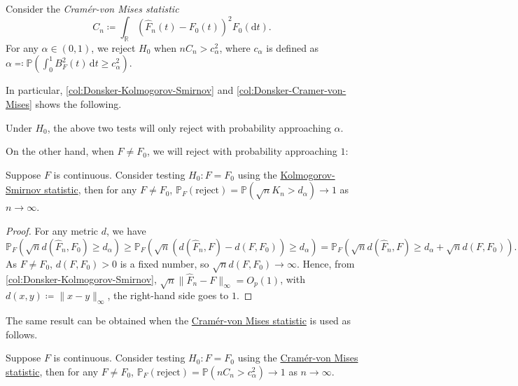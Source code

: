 \begin{eg}\label{eg:goodness-of-fit-Cramér-von-Mises}
	Consider the \emph{Cramér-von Mises statistic}
	\[
		C_n \coloneqq \int _\mathbb{R} \left( \hat{F} _n(t) - F_0(t) \right) ^2 F_0(\mathrm{d} t).
	\]
	For any \(\alpha \in (0, 1)\), we reject \(H_0\) when \(n C_n > c_{\alpha }^2\), where \(c_\alpha \) is defined as \(\alpha \eqqcolon \mathbb{P} (\int_{0}^{1} B_F^2(t) \,\mathrm{d}t \geq c_\alpha ^2)\).
\end{eg}
In particular, \autoref{col:Donsker-Kolmogorov-Smirnov} and \autoref{col:Donsker-Cramer-von-Mises} shows the following.

\begin{remark}
	Under \(H_0\), the above two tests will only reject with probability approaching \(\alpha \).
\end{remark}

On the other hand, when \(F \neq F_0\), we will reject with probability approaching \(1\):

\begin{proposition}\label{prop:goodness-of-fit-Kolmogorov-Smirnov}
	Suppose \(F\) is continuous. Consider testing \(H_0 \colon F = F_0\) using the \hyperref[eg:goodness-of-fit-Kolmogorov-Smirnov]{Kolmogorov-Smirnov statistic}, then for any \(F \neq F_0\), \(\mathbb{P} _F(\text{reject} ) = \mathbb{P} (\sqrt{n} K_n > d_\alpha ) \to 1\) as \(n \to \infty \).
\end{proposition}
\begin{proof}
	For any metric \(d\), we have
	\[
		\mathbb{P} _F (\sqrt{n} d(\hat{F} _n, F_0) \geq d_\alpha )
		\geq \mathbb{P} _F(\sqrt{n} (d(\hat{F} _n, F) - d(F, F_0))\geq d_\alpha )
		= \mathbb{P} _F(\sqrt{n} d(\hat{F} _n, F) \geq d_\alpha + \sqrt{n} d(F, F_0)).
	\]
	As \(F \neq F_0\), \(d(F, F_0) > 0\) is a fixed number, so \(\sqrt{n} d(F, F_0) \to \infty \). Hence, from \autoref{col:Donsker-Kolmogorov-Smirnov}, \(\sqrt{n} \lVert \hat{F} _n - F \rVert _\infty = O_p(1)\), with \(d(x, y) \coloneqq \lVert x - y \rVert _\infty \), the right-hand side goes to \(1\).
\end{proof}

The same result can be obtained when the \hyperref[eg:goodness-of-fit-Cramér-von-Mises]{Cramér-von Mises statistic} is used as follows.

\begin{proposition}\label{prop:goodness-of-fit-Cramér-von-Mises}
	Suppose \(F\) is continuous. Consider testing \(H_0 \colon F = F_0\) using the \hyperref[eg:goodness-of-fit-Cramér-von-Mises]{Cramér-von Mises statistic}, then for any \(F \neq F_0\), \(\mathbb{P} _F(\text{reject} ) = \mathbb{P} (n C_n > c_\alpha ^2) \to 1\) as \(n \to \infty \).
\end{proposition}

